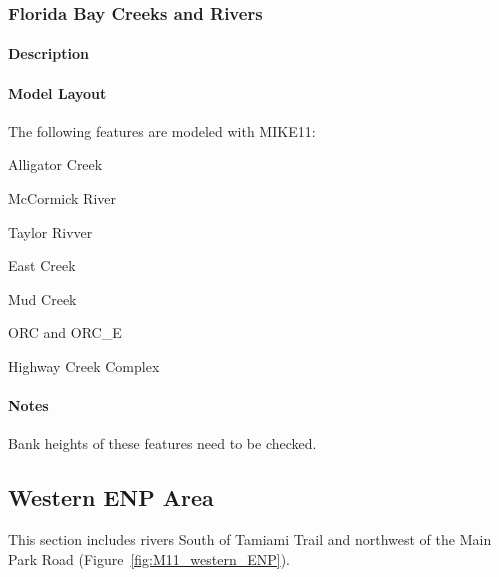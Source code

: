 \clearpage

\subsubsection{Florida Bay Creeks and Rivers}
\paragraph{Description}

\paragraph{Model Layout}

The following features are modeled with MIKE11:
\begin{packed_items}
  \item Alligator Creek
  \item McCormick River
  \item Taylor Rivver
  \item East Creek
  \item Mud Creek
  \item ORC and ORC\_E
  \item Highway Creek Complex
\end{packed_items}

\begin{notes}
\paragraph{Notes}
Bank heights of these features need to be checked.
\end{notes}

\clearpage


\subsection{Western ENP Area}
This section includes rivers South of Tamiami Trail and northwest of the Main Park Road (Figure~\ref{fig:M11_western_ENP}).


